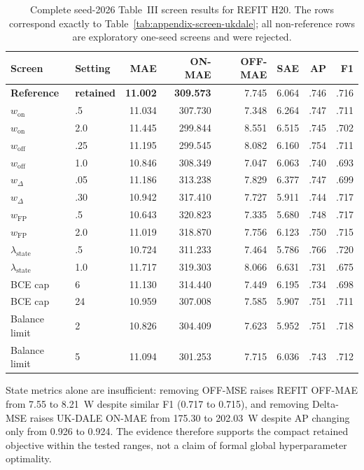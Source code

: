 \documentclass[conference]{IEEEtran}
\newcommand{\selected}[1]{\textbf{#1}}
\begin{document}
\begin{table}[!t]
\caption{Complete seed-2026 Table~III screen results for REFIT H20.  The rows correspond exactly to Table~\ref{tab:appendix-screen-ukdale}; all non-reference rows are exploratory one-seed screens and were rejected.}
\label{tab:appendix-screen-refit}
\centering\scriptsize
\begin{tabular}{llrrrrrr}
\toprule
Screen & Setting & MAE & ON-MAE & OFF-MAE & SAE & AP & F1 \\
\midrule
\selected{Reference} & \selected{retained} & \selected{11.002} & \selected{309.573} & 7.745 & 6.064 & .746 & .716 \\
$w_{\mathrm{on}}$ & .5 & 11.034 & 307.730 & 7.348 & 6.264 & .747 & .711 \\
$w_{\mathrm{on}}$ & 2.0 & 11.445 & 299.844 & 8.551 & 6.515 & .745 & .702 \\
$w_{\mathrm{off}}$ & .25 & 11.195 & 299.545 & 8.082 & 6.160 & .754 & .711 \\
$w_{\mathrm{off}}$ & 1.0 & 10.846 & 308.349 & 7.047 & 6.063 & .740 & .693 \\
$w_{\Delta}$ & .05 & 11.186 & 313.238 & 7.829 & 6.377 & .747 & .699 \\
$w_{\Delta}$ & .30 & 10.942 & 317.410 & 7.727 & 5.911 & .744 & .717 \\
$w_{\mathrm{FP}}$ & .5 & 10.643 & 320.823 & 7.335 & 5.680 & .748 & .717 \\
$w_{\mathrm{FP}}$ & 2.0 & 11.019 & 318.870 & 7.756 & 6.123 & .750 & .715 \\
$\lambda_{\mathrm{state}}$ & .5 & 10.724 & 311.233 & 7.464 & 5.786 & .766 & .720 \\
$\lambda_{\mathrm{state}}$ & 1.0 & 11.717 & 319.303 & 8.066 & 6.631 & .731 & .675 \\
BCE cap & 6 & 11.130 & 314.440 & 7.449 & 6.195 & .734 & .698 \\
BCE cap & 24 & 10.959 & 307.008 & 7.585 & 5.907 & .751 & .711 \\
Balance limit & 2 & 10.826 & 304.409 & 7.623 & 5.952 & .751 & .718 \\
Balance limit & 5 & 11.094 & 301.253 & 7.715 & 6.036 & .743 & .712 \\
\bottomrule
\end{tabular}
\end{table}

State metrics alone are insufficient: removing OFF-MSE raises REFIT OFF-MAE from 7.55 to 8.21~W despite similar F1 (0.717 to 0.715), and removing Delta-MSE raises UK-DALE ON-MAE from 175.30 to 202.03~W despite AP changing only from 0.926 to 0.924. The evidence therefore supports the compact retained objective within the tested ranges, not a claim of formal global hyperparameter optimality.
\end{document}
